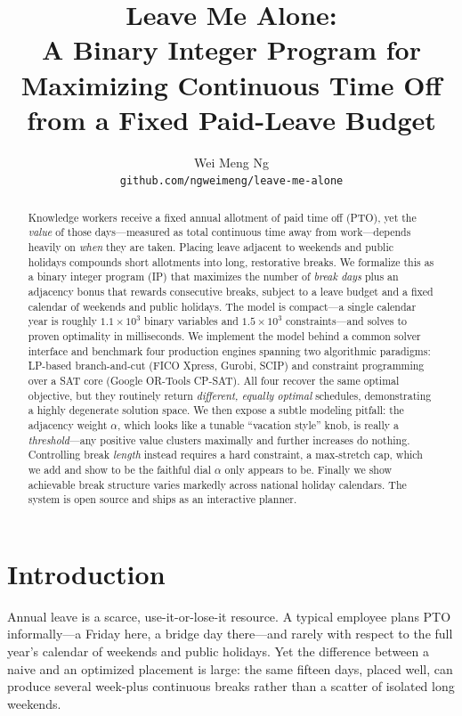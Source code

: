\documentclass[10pt,twocolumn]{article}
\title{\textbf{Leave Me Alone:}\\
A Binary Integer Program for Maximizing Continuous Time Off\\
from a Fixed Paid-Leave Budget}
\author{Wei Meng Ng\\
\small\texttt{github.com/ngweimeng/leave-me-alone}}
\date{}
\begin{document}
\maketitle

\begin{abstract}
Knowledge workers receive a fixed annual allotment of paid time off (PTO), yet
the \emph{value} of those days---measured as total continuous time away from
work---depends heavily on \emph{when} they are taken. Placing leave adjacent to
weekends and public holidays compounds short allotments into long, restorative
breaks. We formalize this as a binary integer program (IP) that maximizes the
number of \emph{break days} plus an adjacency bonus that rewards consecutive
breaks, subject to a leave budget and a fixed calendar of weekends and public
holidays. The model is compact---a single calendar year is roughly
$1.1\times10^{3}$ binary variables and $1.5\times10^{3}$ constraints---and
solves to proven optimality in milliseconds. We implement the model behind a
common solver interface and benchmark four production engines spanning two
algorithmic paradigms: LP-based branch-and-cut (FICO Xpress, Gurobi, SCIP) and
constraint programming over a SAT core (Google OR-Tools CP-SAT). All four
recover the same optimal objective, but they routinely return
\emph{different, equally optimal} schedules, demonstrating a highly degenerate
solution space. We then expose a subtle modeling pitfall: the adjacency weight
$\alpha$, which looks like a tunable ``vacation style'' knob, is really a
\emph{threshold}---any positive value clusters maximally and further increases
do nothing. Controlling break \emph{length} instead requires a hard
constraint, a max-stretch cap, which we add and show to be the faithful dial
$\alpha$ only appears to be. Finally we show achievable break structure varies
markedly across national holiday calendars. The system is open source and ships
as an interactive planner.
\end{abstract}

\section{Introduction}

Annual leave is a scarce, use-it-or-lose-it resource. A typical employee plans
PTO informally---a Friday here, a bridge day there---and rarely with respect to
the full year's calendar of weekends and public holidays. Yet the difference
between a naive and an optimized placement is large: the same fifteen days,
placed well, can produce several week-plus continuous breaks rather than a
scatter of isolated long weekends.
\end{document}
